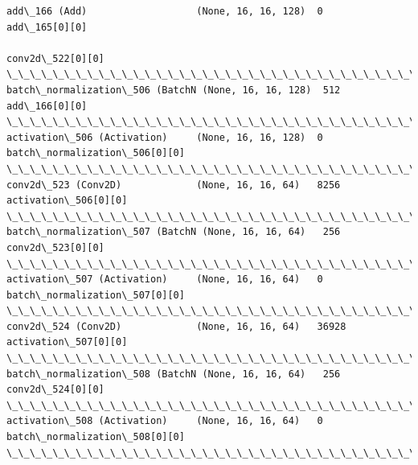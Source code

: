 \documentclass[11pt]{article}
\begin{document}
\begin{Verbatim}[commandchars=\\\{\}]
add\_166 (Add)                   (None, 16, 16, 128)  0           add\_165[0][0]                    
                                                                 conv2d\_522[0][0]                 
\_\_\_\_\_\_\_\_\_\_\_\_\_\_\_\_\_\_\_\_\_\_\_\_\_\_\_\_\_\_\_\_\_\_\_\_\_\_\_\_\_\_\_\_\_\_\_\_\_\_\_\_\_\_\_\_\_\_\_\_\_\_\_\_\_\_\_\_\_\_\_\_\_\_\_\_\_\_\_\_\_\_\_\_\_\_\_\_\_\_\_\_\_\_\_\_\_\_
batch\_normalization\_506 (BatchN (None, 16, 16, 128)  512         add\_166[0][0]                    
\_\_\_\_\_\_\_\_\_\_\_\_\_\_\_\_\_\_\_\_\_\_\_\_\_\_\_\_\_\_\_\_\_\_\_\_\_\_\_\_\_\_\_\_\_\_\_\_\_\_\_\_\_\_\_\_\_\_\_\_\_\_\_\_\_\_\_\_\_\_\_\_\_\_\_\_\_\_\_\_\_\_\_\_\_\_\_\_\_\_\_\_\_\_\_\_\_\_
activation\_506 (Activation)     (None, 16, 16, 128)  0           batch\_normalization\_506[0][0]    
\_\_\_\_\_\_\_\_\_\_\_\_\_\_\_\_\_\_\_\_\_\_\_\_\_\_\_\_\_\_\_\_\_\_\_\_\_\_\_\_\_\_\_\_\_\_\_\_\_\_\_\_\_\_\_\_\_\_\_\_\_\_\_\_\_\_\_\_\_\_\_\_\_\_\_\_\_\_\_\_\_\_\_\_\_\_\_\_\_\_\_\_\_\_\_\_\_\_
conv2d\_523 (Conv2D)             (None, 16, 16, 64)   8256        activation\_506[0][0]             
\_\_\_\_\_\_\_\_\_\_\_\_\_\_\_\_\_\_\_\_\_\_\_\_\_\_\_\_\_\_\_\_\_\_\_\_\_\_\_\_\_\_\_\_\_\_\_\_\_\_\_\_\_\_\_\_\_\_\_\_\_\_\_\_\_\_\_\_\_\_\_\_\_\_\_\_\_\_\_\_\_\_\_\_\_\_\_\_\_\_\_\_\_\_\_\_\_\_
batch\_normalization\_507 (BatchN (None, 16, 16, 64)   256         conv2d\_523[0][0]                 
\_\_\_\_\_\_\_\_\_\_\_\_\_\_\_\_\_\_\_\_\_\_\_\_\_\_\_\_\_\_\_\_\_\_\_\_\_\_\_\_\_\_\_\_\_\_\_\_\_\_\_\_\_\_\_\_\_\_\_\_\_\_\_\_\_\_\_\_\_\_\_\_\_\_\_\_\_\_\_\_\_\_\_\_\_\_\_\_\_\_\_\_\_\_\_\_\_\_
activation\_507 (Activation)     (None, 16, 16, 64)   0           batch\_normalization\_507[0][0]    
\_\_\_\_\_\_\_\_\_\_\_\_\_\_\_\_\_\_\_\_\_\_\_\_\_\_\_\_\_\_\_\_\_\_\_\_\_\_\_\_\_\_\_\_\_\_\_\_\_\_\_\_\_\_\_\_\_\_\_\_\_\_\_\_\_\_\_\_\_\_\_\_\_\_\_\_\_\_\_\_\_\_\_\_\_\_\_\_\_\_\_\_\_\_\_\_\_\_
conv2d\_524 (Conv2D)             (None, 16, 16, 64)   36928       activation\_507[0][0]             
\_\_\_\_\_\_\_\_\_\_\_\_\_\_\_\_\_\_\_\_\_\_\_\_\_\_\_\_\_\_\_\_\_\_\_\_\_\_\_\_\_\_\_\_\_\_\_\_\_\_\_\_\_\_\_\_\_\_\_\_\_\_\_\_\_\_\_\_\_\_\_\_\_\_\_\_\_\_\_\_\_\_\_\_\_\_\_\_\_\_\_\_\_\_\_\_\_\_
batch\_normalization\_508 (BatchN (None, 16, 16, 64)   256         conv2d\_524[0][0]                 
\_\_\_\_\_\_\_\_\_\_\_\_\_\_\_\_\_\_\_\_\_\_\_\_\_\_\_\_\_\_\_\_\_\_\_\_\_\_\_\_\_\_\_\_\_\_\_\_\_\_\_\_\_\_\_\_\_\_\_\_\_\_\_\_\_\_\_\_\_\_\_\_\_\_\_\_\_\_\_\_\_\_\_\_\_\_\_\_\_\_\_\_\_\_\_\_\_\_
activation\_508 (Activation)     (None, 16, 16, 64)   0           batch\_normalization\_508[0][0]    
\_\_\_\_\_\_\_\_\_\_\_\_\_\_\_\_\_\_\_\_\_\_\_\_\_\_\_\_\_\_\_\_\_\_\_\_\_\_\_\_\_\_\_\_\_\_\_\_\_\_\_\_\_\_\_\_\_\_\_\_\_\_\_\_\_\_\_\_\_\_\_\_\_\_\_\_\_\_\_\_\_\_\_\_\_\_\_\_\_\_\_\_\_\_\_\_\_\_

\end{Verbatim}
\end{document}
